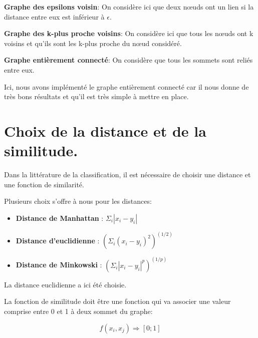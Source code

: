 \textbf{Graphe des epsilons voisin}: On considère ici que deux nœuds ont un lien si la distance entre eux est inférieur à $\epsilon$.

\medskip

\textbf{Graphe des k-plus proche voisins}: On considère ici que tous les nœuds ont k voisins et qu'ils sont les k-plus proche du nœud considéré.

\medskip

\textbf{Graphe entièrement connecté}: On considère que tous les sommets sont reliés entre eux. 

\medskip

Ici, nous avons implémenté le graphe entièrement connecté car il nous donne de très bons résultats et qu'il est très simple à mettre en place.

\section{Choix de la distance et de la similitude.}

Dans la littérature de la classification, il est nécessaire de choisir une distance et une fonction de similarité.

\medskip

Plusieurs choix s'offre à nous pour les distances:

\begin{itemize}

\medskip

\item \textbf{Distance de Manhattan} : $\Sigma_i|x_i-y_i|$

\medskip

\item \textbf{Distance d'euclidienne} : $(\Sigma_i(x_i-y_i)^2)^(1/2)$

\medskip

\item \textbf{Distance de Minkowski} : $(\Sigma_i|x_i-y_i|^p)^(1/p)$

\medskip

\end{itemize}

La distance euclidienne a ici été choisie.

\medskip

La fonction de similitude doit être une fonction qui va associer une valeur comprise entre 0 et 1 à deux sommet du graphe:

\begin{equation}
f(x_i,x_j) \Rightarrow [0 ; 1]
\end{equation}

